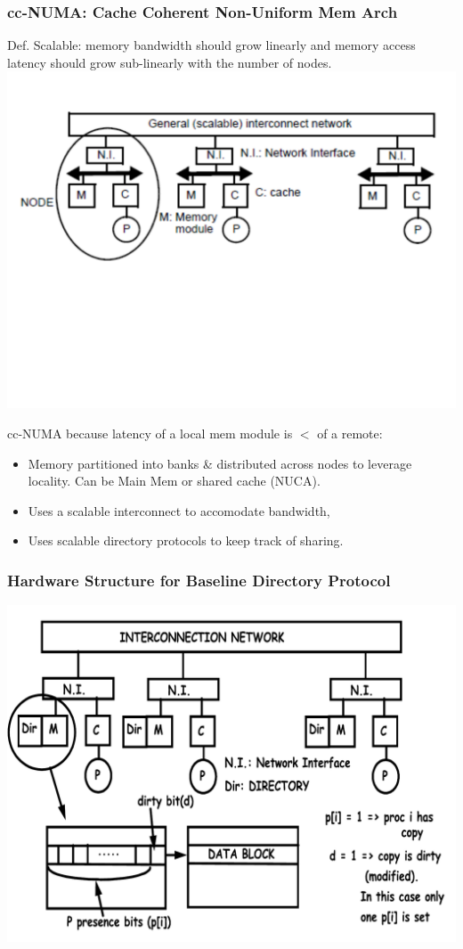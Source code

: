 \documentclass{beamer}
\renewcommand{\emph}[1]{\textcolor{structure}{#1}}
\begin{document}
\begin{frame}[fragile,t]
\frametitle{cc-NUMA: Cache Coherent Non-Uniform Mem Arch}

\emph{Def. Scalable: memory bandwidth should grow linearly and
memory access latency should grow sub-linearly with the number of nodes}.
\includegraphics[width=59ex]{Figures/FigsInfCoherence/MultiNode}
\vspace{-20ex}

\emph{cc-NUMA} because latency of a local mem module is $<$ of a remote:\\
\begin{itemize}
    \item Memory partitioned into banks \& distributed across nodes 
            to leverage locality. Can be Main Mem or shared cache (NUCA).
    \item Uses a scalable interconnect to accomodate bandwidth,
    \item \emph{Uses scalable directory protocols to keep track of sharing.}
\end  {itemize}

\end{frame}

\begin{frame}[fragile,t]
\frametitle{Hardware Structure for Baseline Directory Protocol}

\includegraphics[width=59ex]{Figures/FigsInfCoherence/DirBasedProt}

\end{frame}
\end{document}
